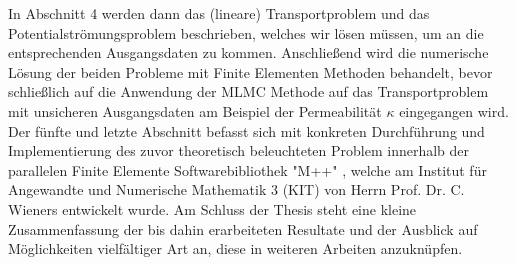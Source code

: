 In Abschnitt 4 werden dann das (lineare) Transportproblem und das Potentialströmungsproblem beschrieben, welches wir lösen müssen, um an die entsprechenden Ausgangsdaten zu kommen. Anschließend wird die numerische Lösung der beiden Probleme mit Finite Elementen Methoden behandelt, bevor schließlich auf die Anwendung der MLMC Methode auf das Transportproblem mit unsicheren Ausgangsdaten am Beispiel der Permeabilität $\kappa$ eingegangen wird. \newline
Der fünfte und letzte Abschnitt befasst sich mit konkreten Durchführung und Implementierung des zuvor theoretisch beleuchteten Problem innerhalb der parallelen Finite Elemente Softwarebibliothek "M++" \cite{siteM++},
welche am Institut für Angewandte und Numerische Mathematik 3 (KIT) von Herrn Prof. Dr. C. Wieners entwickelt wurde. \newline
Am Schluss der Thesis steht eine kleine Zusammenfassung der bis dahin erarbeiteten Resultate und der Ausblick auf Möglichkeiten vielfältiger Art an, diese in weiteren Arbeiten anzuknüpfen.